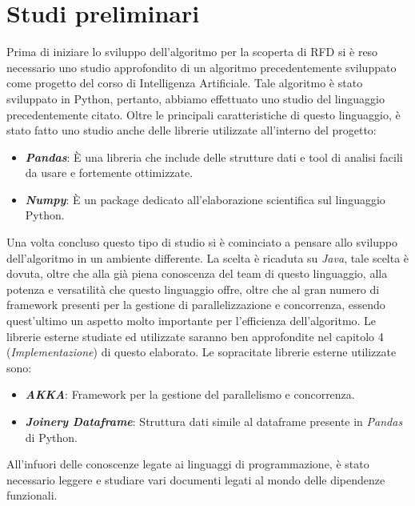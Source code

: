 \section{Studi preliminari}
Prima di iniziare lo sviluppo dell'algoritmo per la scoperta di RFD si è reso necessario uno studio approfondito di un algoritmo precedentemente sviluppato come progetto del corso di Intelligenza Artificiale\cite{tesinaIA}.
Tale algoritmo è stato sviluppato in Python, pertanto, abbiamo effettuato uno studio del linguaggio precedentemente citato.
Oltre le principali caratteristiche di questo linguaggio, è stato fatto uno studio anche delle librerie utilizzate all'interno del progetto:
\begin{itemize}
	\item \textbf{\emph{Pandas}}: È una libreria che include delle strutture dati e tool di analisi facili da usare e fortemente ottimizzate. 
	\item \textbf{\emph{Numpy}}: È un package dedicato all'elaborazione scientifica sul linguaggio Python.
\end{itemize}
Una volta concluso questo tipo di studio si è cominciato a pensare allo sviluppo dell'algoritmo in un ambiente differente.
La scelta è ricaduta su \emph{Java}, tale scelta è dovuta, oltre che alla già piena conoscenza del team di questo linguaggio, alla potenza e versatilità che questo linguaggio offre, oltre che al gran numero di framework presenti per la gestione di parallelizzazione e concorrenza, essendo quest'ultimo un aspetto molto importante per l'efficienza dell'algoritmo.
Le librerie esterne studiate ed utilizzate saranno ben approfondite nel capitolo 4 (\emph{Implementazione}) di questo elaborato.
Le sopracitate librerie esterne utilizzate sono:
\begin{itemize}
	\item \textbf{\emph{AKKA}}: Framework per la  gestione del parallelismo e concorrenza.
	\item \textbf{\emph{Joinery Dataframe}}: Struttura dati simile al dataframe presente in \emph{Pandas} di Python.
\end{itemize}
All'infuori delle conoscenze legate ai linguaggi di programmazione, è stato necessario leggere e studiare vari documenti legati al mondo delle dipendenze funzionali. 